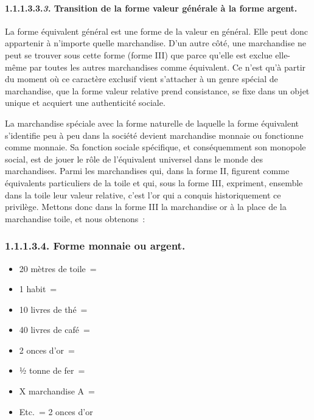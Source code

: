 \documentclass[french,twoside]{book} %
\begin{document}
\paragraph[{1.1.1.3.3.3. Transition de la forme valeur générale à la forme argent.}]{1.1.1.3.3.\emph{3}. Transition de la forme valeur générale à la forme argent.}
\noindent La forme équivalent général est une forme de la valeur en général. Elle peut donc appartenir à n’importe quelle marchandise. D’un autre côté, une marchandise ne peut se trouver sous cette forme (forme III) que parce qu’elle est exclue elle-même par toutes les autres marchandises comme équivalent. Ce n’est qu’à partir du moment où ce caractère exclusif vient s’attacher à un genre spécial de marchandise, que la forme valeur relative prend consistance, se fixe dans un objet unique et acquiert une authenticité sociale.\par
La marchandise spéciale avec la forme naturelle de laquelle la forme équivalent s’identifie peu à peu dans la société devient marchandise monnaie ou fonctionne comme monnaie. Sa fonction sociale spécifique, et conséquemment son monopole social, est de jouer le rôle de l’équivalent universel dans le monde des marchandises. Parmi les marchandises qui, dans la forme II, figurent comme équivalents particuliers de la toile et qui, sous la forme III, expriment, ensemble dans la toile leur valeur relative, c’est l’or qui a conquis historiquement ce privilège. Mettons donc dans la forme III la marchandise or à la place de la marchandise toile, et nous obtenons :
\subsubsection[{1.1.1.3.4. Forme monnaie ou argent.}]{1.1.1.3.4. Forme monnaie ou argent\protect\footnotemark .}

\begin{itemize}[itemsep=0pt,]
\item 20 mètres de toile =
\item 1 habit =
\item 10 livres de thé =
\item 40 livres de café =
\item 2 onces d’or =
\item ½ tonne de fer =
\item X marchandise A =
\item Etc. = 2 onces d’or
\end{itemize}
\end{document}
